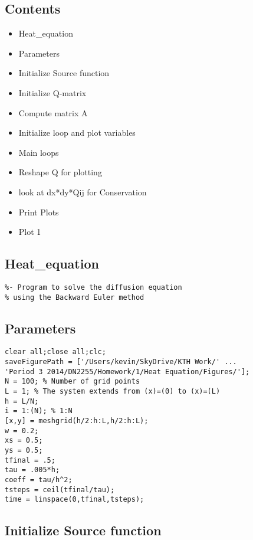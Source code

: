 \subsection*{Contents}

\begin{itemize}
\setlength{\itemsep}{-1ex}
   \item Heat\_equation
   \item Parameters
   \item Initialize Source function
   \item Initialize Q-matrix
   \item Compute matrix A
   \item Initialize loop and plot variables
   \item Main loops
   \item Reshape Q for plotting
   \item look at dx*dy*Qij for Conservation
   \item Print Plots
   \item Plot 1
\end{itemize}


\subsection*{Heat\_equation}

\begin{verbatim}
%- Program to solve the diffusion equation
% using the Backward Euler method
\end{verbatim}


\subsection*{Parameters}

\begin{verbatim}
clear all;close all;clc;
saveFigurePath = ['/Users/kevin/SkyDrive/KTH Work/' ...
'Period 3 2014/DN2255/Homework/1/Heat Equation/Figures/'];
N = 100; % Number of grid points
L = 1; % The system extends from (x)=(0) to (x)=(L)
h = L/N;
i = 1:(N); % 1:N
[x,y] = meshgrid(h/2:h:L,h/2:h:L);
w = 0.2;
xs = 0.5;
ys = 0.5;
tfinal = .5;
tau = .005*h;
coeff = tau/h^2;
tsteps = ceil(tfinal/tau);
time = linspace(0,tfinal,tsteps);
\end{verbatim}


\subsection*{Initialize Source function}

